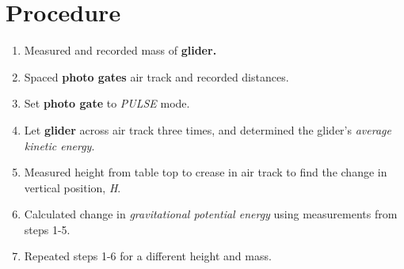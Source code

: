 
\section{Procedure}
\vspace{-0.5cm}
\singlespacing




\begin{enumerate}
		\item Measured and recorded mass of \textbf{glider.}

		\item Spaced \textbf{photo gates }air track and recorded distances.

		\item Set \textbf{photo gate }to \emph{PULSE }mode.

		\item Let \textbf{glider }across air track three times, and determined the
			glider's \emph{average kinetic energy}.

		\item Measured height from table top to crease in air track to find the change
			in vertical position, \emph{H}.

		\item Calculated change in \emph{gravitational potential energy }using measurements
			from steps 1-5.

		\item Repeated steps 1-6 for a different height and mass.
	\end{enumerate}

\newpage




